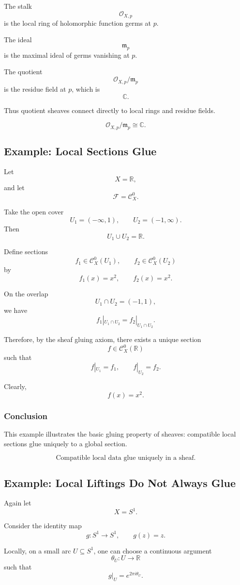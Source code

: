 \documentclass[12pt,a4paper]{article}
\newcommand{\F}{\mathcal F}
\newcommand{\RR}{\mathbb{R}}
\newcommand{\Czero}{\mathcal C^0}        %
\newcommand{\CC}{\mathbb{C}}
\newcommand{\OO}{\mathcal{O}}
\theoremstyle{notespace}
\newcommand{\SSone}{S^1}
\begin{document}
The stalk
\[
\OO_{X,p}
\]
is the local ring of holomorphic function germs at \(p\).

The ideal
\[
\mathfrak m_p
\]
is the maximal ideal of germs vanishing at \(p\).

The quotient
\[
\OO_{X,p}/\mathfrak m_p
\]
is the residue field at \(p\), which is
\[
\CC.
\]

Thus quotient sheaves connect directly to local rings and residue fields.

\[
\boxed{
	\OO_{X,p}/\mathfrak m_p\cong \CC.
}
\]

\subsection{Example: Local Sections Glue}

Let
\[
X=\RR,
\]
and let
\[
\F=\Czero_X.
\]

Take the open cover
\[
U_1=(-\infty,1),
\qquad
U_2=(-1,\infty).
\]
Then
\[
U_1\cup U_2=\RR.
\]

Define sections
\[
f_1\in \Czero_X(U_1),
\qquad
f_2\in \Czero_X(U_2)
\]
by
\[
f_1(x)=x^2,
\qquad
f_2(x)=x^2.
\]

On the overlap
\[
U_1\cap U_2=(-1,1),
\]
we have
\[
f_1|_{U_1\cap U_2}=f_2|_{U_1\cap U_2}.
\]

Therefore, by the sheaf gluing axiom, there exists a unique section
\[
f\in \Czero_X(\RR)
\]
such that
\[
f|_{U_1}=f_1,
\qquad
f|_{U_2}=f_2.
\]

Clearly,
\[
f(x)=x^2.
\]

\subsubsection*{Conclusion}

This example illustrates the basic gluing property of sheaves:
compatible local sections glue uniquely to a global section.

\[
\boxed{
	\text{Compatible local data glue uniquely in a sheaf.}
}
\]


\subsection{Example: Local Liftings Do Not Always Glue}

Again let
\[
X=\SSone.
\]

Consider the identity map
\[
g:\SSone\to \SSone,
\qquad
g(z)=z.
\]

Locally, on a small arc \(U\subseteq \SSone\), one can choose a continuous argument
\[
\theta_U:U\to \RR
\]
such that
\[
g|_U=e^{2\pi i\theta_U}.
\]
\end{document}
